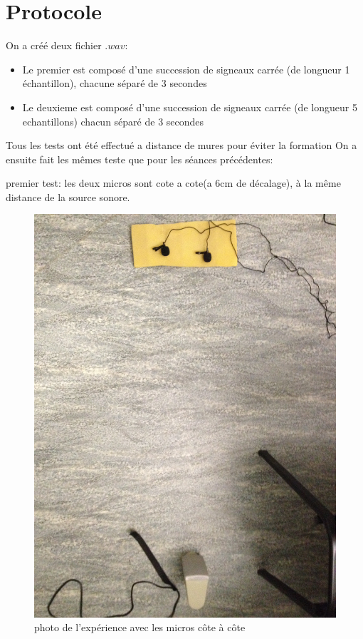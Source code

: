 \documentclass[12pt,a4paper]{article}
\begin{document}
\section{Protocole}
	On a créé deux fichier $.wav$:
	\begin{itemize}
	\item Le premier est composé d'une succession de signeaux carrée (de longueur 1 échantillon), chacune séparé de 3 secondes
	\item Le deuxieme est composé d'une succession de signeaux carrée (de longueur 5 echantillons) chacun séparé de 3 secondes
	\end{itemize}
	Tous les tests ont été effectué a distance de mures pour éviter la formation 
	On a ensuite fait les mêmes teste que pour les séances précédentes:

	
	
	

	premier test:
		les deux micros sont cote a cote(a 6cm de décalage), à la même distance de la source sonore.
\begin{figure}[H]
		\includegraphics[width=\textwidth]{../donnees11-03/test_1.jpg} 
		\caption{photo de l'expérience avec les micros côte à côte}
\end{figure}
		
\end{document}
